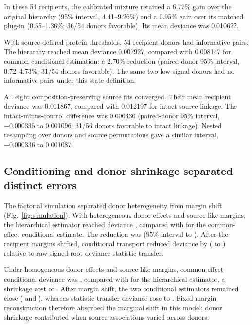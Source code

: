 \documentclass[pdflatex,sn-vancouver-num,iicol]{sn-jnl}
\begin{document}
In these 54 recipients, the calibrated mixture retained a 6.77\% gain over the original hierarchy (95\% interval, 4.41--9.26\%) and a 0.95\% gain over its matched plug-in (0.55--1.36\%; 36/54 donors favorable). Its mean deviance was 0.010622.

With source-defined protein thresholds, 54 recipient donors had informative pairs. The hierarchy reached mean deviance 0.007927, compared with 0.008147 for common conditional estimation: a 2.70\% reduction (paired-donor 95\% interval, 0.72--4.73\%; 31/54 donors favorable). The same two low-signal donors had no informative pairs under this state definition.

All eight composition-preserving source fits converged. Their mean recipient deviance was 0.011867, compared with 0.012197 for intact source linkage. The intact-minus-control difference was 0.000330 (paired-donor 95\% interval, $-0.000335$ to 0.001096; 31/56 donors favorable to intact linkage). Nested resampling over donors and source permutations gave a similar interval, $-0.000336$ to 0.001087.

\subsection{Conditioning and donor shrinkage separated distinct errors}

The factorial simulation separated donor heterogeneity from margin shift (Fig.~\ref{fig:simulation}). With heterogeneous donor effects and source-like margins, the hierarchical estimator reached deviance \SimHetSameHier{}, compared with \SimHetSameCommon{} for the common-effect conditional estimate. The reduction was \SimHetSameCommonReduction{} (95\% interval \SimHetSameCommonReductionLo{} to \SimHetSameCommonReductionHi{}). After the recipient margins shifted, conditional transport reduced deviance by \SimHetShiftResidualReduction{} (\SimHetShiftResidualReductionLo{} to \SimHetShiftResidualReductionHi{}) relative to raw signed-root deviance-statistic transfer.

Under homogeneous donor effects and source-like margins, common-effect conditional deviance was \SimHomSameCommon{}, compared with \SimHomSameHier{} for the hierarchical estimator, a shrinkage cost of \SimHomSameHierPenalty{}. After margin shift, the two conditional estimators remained close (\SimHomShiftCommon{} and \SimHomShiftHier{}), whereas statistic-transfer deviance rose to \SimHomShiftResidual{}. Fixed-margin reconstruction therefore absorbed the marginal shift in this model; donor shrinkage contributed when source associations varied across donors.
\end{document}

